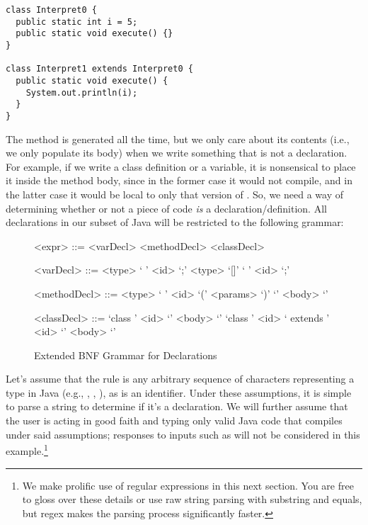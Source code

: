 \begin{verbatim}
class Interpret0 {
  public static int i = 5;
  public static void execute() {}
}

class Interpret1 extends Interpret0 {
  public static void execute() {
    System.out.println(i);  
  }
}
\end{verbatim}

The  method is generated all the time, but we only care about its contents (i.e., we only populate its body) when we write something that is not a declaration. For example, if we write a class definition or a variable, it is nonsensical to place it inside the  method body, since in the former case it would not compile, and in the latter case it would be local to only that version of . So, we need a way of determining whether or not a piece of code \textit{is} a declaration/definition. All declarations in our subset of Java will be restricted to the following grammar:

\setlength{\grammarparsep}{20pt plus 1pt minus 1pt} %
\setlength{\grammarindent}{12em} %
\begin{figure}[H]
        \begin{grammar}
            <expr> ::= <varDecl> 
                    \alt <methodDecl> 
                    \alt <classDecl>

            <varDecl> ::= <type> ` ' <id> `;'
                      \alt <type> `[]' ` ' <id> `;'

            <methodDecl> ::= <type> ` ' <id> `(' <params> `)' `{' <body> `}'

            <classDecl> ::= `class ' <id> `{' <body> `}'
                        \alt `class ' <id> ` extends ' <id> `{' <body> `}'

        \end{grammar}
    \caption{ Extended BNF Grammar for Declarations }
\end{figure}

Let's assume that the  rule is any arbitrary sequence of characters representing a type in Java (e.g., , , ), as is an identifier. Under these assumptions, it is simple to parse a string to determine if it's a declaration. We will further assume that the user is acting in good faith and typing only valid Java code that compiles under said assumptions; responses to inputs such as  will not be considered in this example.\footnote{We make prolific use of regular expressions in this next section. You are free to gloss over these details or use raw string parsing with substring and equals, but regex makes the parsing process significantly faster.}

